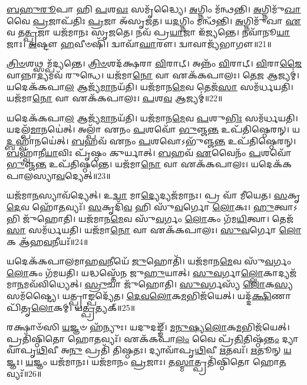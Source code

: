 \-\ul{𑌬}\-\-\ul{𑌹𑍁}\-\-\ul{𑌰𑍂}\-𑌪𑌾 𑌹𑌿 \ul{𑌪}\-𑌶\-\ul{𑌵𑌃} 𑌸𑌮𑍃᳴𑌦𑍍𑌧𑍍𑌯𑍈।
\-\ul{𑌅}\-𑌗𑍍𑌨𑌿𑌂 𑌮᳴𑌨𑍍𑌥𑌨𑍍𑌤𑌿।
\-\ul{𑌅}\-𑌗𑍍𑌨𑌿𑌮𑍁᳴\-\ul{𑌖𑌾} 𑌵𑍈 \ul{𑌪𑍍𑌰}\-𑌜𑌾\-𑌪᳴𑌤𑌿𑌃 \ul{𑌪𑍍𑌰}\-𑌜𑌾 𑌅᳴\-𑌸𑍃𑌜𑌤।
𑌯\-\ul{𑌦}\-𑌗𑍍𑌨𑌿𑌂 𑌮𑌨𑍍𑌥᳴𑌨𑍍𑌤𑌿।
\-\ul{𑌅}\-𑌗𑍍𑌨𑌿𑌮𑍁᳴𑌖𑌾 \ul{𑌏}\-𑌵 𑌤\-\ul{𑌤𑍍𑌪𑍍𑌰}\-𑌜𑌾 𑌯𑌜᳴𑌮𑌾𑌨𑌃 𑌸𑍃𑌜𑌤𑍇।
𑌨𑌵᳴ 𑌪𑍍𑌰\-\ul{𑌯𑌾}\-𑌜𑌾 𑌇᳴𑌜𑍍𑌯𑌨𑍍𑌤𑍇।
𑌨𑌵𑌾᳴𑌨𑍂\-\ul{𑌯𑌾}\-𑌜𑌾𑌃।
\-\ul{𑌅}\-𑌷𑍍𑌟𑍗 \ul{𑌹}\-𑌵𑍀𑍞𑌷𑌿᳴।
𑌦𑍍𑌵𑌾𑌵𑌾᳴\-\ul{𑌘𑌾}\-𑌰𑍗।
𑌦𑍍𑌵𑌾𑌵𑌾𑌜𑍍𑌯᳴𑌭𑌾𑌗𑍗॥21॥

\-\ul{𑌤𑍍𑌰𑌿}\-\-\ul{𑍞}\-𑌶𑌥𑍍𑌸𑌮𑍍𑌪᳴𑌦𑍍𑌯𑌨𑍍𑌤𑍇।
\-\ul{𑌤𑍍𑌰𑌿}\-\-\ul{𑍞}\-𑌶𑌦᳴𑌕𑍍𑌷𑌰𑌾 \ul{𑌵𑌿}\-𑌰𑌾𑌟𑍍।
𑌅𑌨𑍍𑌨𑌂᳴ \ul{𑌵𑌿}\-𑌰𑌾𑌟𑍍।
\-\ul{𑌵𑌿}\-𑌰𑌾\-\ul{𑌜𑍈}\-𑌵𑌾𑌨𑍍𑌨𑌾\-\ul{𑌦𑍍𑌯}\-𑌮𑌵᳴ 𑌰𑍁𑌨𑍍𑌧𑍇।
𑌯𑌜᳴𑌮𑌾\-\ul{𑌨𑍋} 𑌵𑌾 𑌏𑌕᳴𑌕𑌪𑌾𑌲𑌃।
𑌤𑍇\-\ul{𑌜} 𑌆𑌜𑍍𑌯𑌮𑍍॑।
𑌯𑌦𑍇𑌕᳴𑌕𑌪𑌾\-\ul{𑌲} 𑌆𑌜𑍍𑌯᳴\-\ul{𑌮𑌾}\-𑌨𑌯᳴𑌤𑌿।
𑌯𑌜᳴𑌮𑌾𑌨\-\ul{𑌮𑍇}\-𑌵 𑌤𑍇𑌜᳴\-\ul{𑌸𑌾} 𑌸𑌮᳴𑌰𑍍𑌧𑌯𑌤𑌿।
𑌯𑌜᳴𑌮𑌾\-\ul{𑌨𑍋} 𑌵𑌾 𑌏𑌕᳴𑌕𑌪𑌾𑌲𑌃।
\-\ul{𑌪}\-𑌶\-\ul{𑌵} 𑌆𑌜𑍍𑌯𑌮𑍍॑॥22॥

𑌯𑌦𑍇𑌕᳴𑌕𑌪𑌾\-\ul{𑌲} 𑌆𑌜𑍍𑌯᳴\-\ul{𑌮𑌾}\-𑌨𑌯᳴𑌤𑌿।
𑌯𑌜᳴𑌮𑌾𑌨\-\ul{𑌮𑍇}\-𑌵 \ul{𑌪}\-𑌶𑍁\-\ul{𑌭𑌿𑌃} 𑌸𑌮᳴𑌰𑍍𑌧𑌯𑌤𑌿।
𑌯𑌦𑌲𑍍𑌪᳴\-\ul{𑌮𑌾}\-𑌨𑌯𑍇॑𑌤𑍍।
𑌅𑌲𑍍𑌪𑌾᳴ 𑌏𑌨𑌂 \ul{𑌪}\-𑌶𑌵𑍋᳴ \ul{𑌭𑍁}\-𑌞𑍍𑌜\-\ul{𑌨𑍍𑌤} 𑌉𑌪᳴𑌤𑌿𑌷𑍍𑌠𑍇𑌰𑌨𑍍।
𑌯\-\ul{𑌦𑍍𑌬}\-𑌹𑍍𑌵𑌾᳴𑌨𑌯𑍇॑𑌤𑍍।
\-\ul{𑌬}\-𑌹𑌵᳴ 𑌏𑌨𑌂 \ul{𑌪}\-𑌶𑌵𑍋\-𑌽𑌭𑍁᳴𑌞𑍍𑌜\-\ul{𑌨𑍍𑌤} 𑌉𑌪᳴𑌤𑌿𑌷𑍍𑌠𑍇𑌰𑌨𑍍।
\-\ul{𑌬}\-𑌹𑍍𑌵𑌾᳴𑌨𑍀\-\ul{𑌯𑌾}\-𑌵𑌿𑌃 𑌪𑍃᳴𑌷𑍍𑌠𑌂 𑌕𑍁𑌰𑍍𑌯𑌾𑌤𑍍।
\-\ul{𑌬}\-𑌹𑌵᳴ \ul{𑌏}\-𑌵𑍈𑌨𑌂᳴ \ul{𑌪}\-𑌶𑌵𑍋᳴ \ul{𑌭𑍁}\-𑌞𑍍𑌜\-\ul{𑌨𑍍𑌤} 𑌉𑌪᳴𑌤𑌿𑌷𑍍𑌠𑌨𑍍𑌤𑍇।
𑌯𑌜᳴𑌮𑌾\-\ul{𑌨𑍋} 𑌵𑌾 𑌏𑌕᳴𑌕𑌪𑌾𑌲𑌃।
𑌯𑌦𑍇𑌕᳴𑌕𑌪𑌾𑌲𑌸𑍍𑌯𑌾\-\ul{𑌵}\-𑌦𑍍𑌯𑍇𑌤𑍍॥23॥

𑌯𑌜᳴𑌮𑌾\-\ul{𑌨}\-𑌸𑍍𑌯𑌾𑌵᳴𑌦𑍍𑌯𑍇𑌤𑍍।
𑌉\-\ul{𑌦𑍍𑌵𑌾} 𑌮𑌾\-\ul{𑌦𑍍𑌯𑍇}\-𑌦𑍍𑌯𑌜᳴𑌮𑌾𑌨𑌃।
𑌪𑍍𑌰 𑌵𑌾᳴ 𑌮𑍀𑌯𑍇𑌤।
\-\ul{𑌸}\-𑌕𑍃\-\ul{𑌦𑍇}\-𑌵 𑌹𑍋᳴\-\ul{𑌤}\-𑌵𑍍𑌯𑌃᳴।
\-\ul{𑌸}\-𑌕𑍃𑌦𑌿᳴\-\ul{𑌵} 𑌹𑌿 𑌸𑍁᳴\-\ul{𑌵}\-𑌰𑍍𑌗𑍋 \ul{𑌲𑍋}\-𑌕𑌃।
\-\ul{𑌹𑍁}\-𑌤𑍍𑌵𑌾𑌽𑌭𑌿 𑌜𑍁᳴𑌹𑍋𑌤𑌿।
𑌯𑌜᳴𑌮𑌾𑌨\-\ul{𑌮𑍇}\-𑌵 𑌸𑍁᳴\-\ul{𑌵}\-𑌰𑍍𑌗𑌂 \ul{𑌲𑍋}\-𑌕𑌂 𑌗᳴𑌮\-\ul{𑌯𑌿}\-𑌤𑍍𑌵𑌾।
𑌤𑍇𑌜᳴\-\ul{𑌸𑌾} 𑌸𑌮᳴𑌰𑍍𑌧𑌯𑌤𑌿।
𑌯𑌜᳴𑌮𑌾\-\ul{𑌨𑍋} 𑌵𑌾 𑌏𑌕᳴𑌕𑌪𑌾𑌲𑌃।
\-\ul{𑌸𑍁}\-\-\ul{𑌵}\-𑌰𑍍𑌗𑍋 \ul{𑌲𑍋}\-𑌕 𑌆᳴𑌹\-\ul{𑌵}\-𑌨𑍀𑌯𑌃᳴॥24॥

𑌯𑌦𑍇𑌕᳴𑌕𑌪𑌾𑌲𑌮𑌾𑌹\-\ul{𑌵}\-𑌨𑍀𑌯𑍇᳴ \ul{𑌜𑍁}\-𑌹𑍋𑌤𑌿᳴।
𑌯𑌜᳴𑌮𑌾𑌨\-\ul{𑌮𑍇}\-𑌵 𑌸𑍁᳴\-\ul{𑌵}\-𑌰𑍍𑌗𑌂 \ul{𑌲𑍋}\-𑌕𑌂 𑌗᳴𑌮𑌯𑌤𑌿।
𑌯𑌦𑍍𑌧𑌸𑍍𑌤𑍇᳴𑌨 𑌜𑍁\-\ul{𑌹𑍁}\-𑌯𑌾𑌤𑍍।
\-\ul{𑌸𑍁}\-\-\ul{𑌵}\-𑌰𑍍𑌗𑌾\-\ul{𑌲𑍍𑌲𑍋}\-𑌕𑌾𑌦𑍍𑌯𑌜᳴𑌮𑌾\-\ul{𑌨}\-𑌮𑌵᳴\-𑌵𑌿𑌧𑍍𑌯𑍇𑌤𑍍।
\-\ul{𑌸𑍍𑌰𑍁}\-𑌚𑌾 𑌜𑍁᳴𑌹𑍋𑌤𑌿।
\-\ul{𑌸𑍁}\-\-\ul{𑌵}\-𑌰𑍍𑌗𑌸𑍍𑌯᳴ \ul{𑌲𑍋}\-𑌕\-\ul{𑌸𑍍𑌯} 𑌸𑌮᳴𑌷𑍍𑌟𑍍𑌯𑍈।
𑌯𑌤𑍍𑌪𑍍𑌰𑌾𑌙𑍍𑌪𑌦𑍍𑌯𑍇᳴𑌤।
\-\ul{𑌦𑍇}\-\-\ul{𑌵}\-\-\ul{𑌲𑍋}\-𑌕\-\ul{𑌮}\-𑌭𑌿𑌜᳴𑌯𑍇𑌤𑍍।
𑌯𑌦𑍍𑌦᳴\-\ul{𑌕𑍍𑌷𑌿}\-𑌣𑌾 𑌪𑌿᳴𑌤𑍃\-\ul{𑌲𑍋}\-𑌕𑌮𑍍।
𑌯\-\ul{𑌤𑍍𑌪𑍍𑌰}\-𑌤𑍍𑌯𑌕𑍍॥25॥

𑌰𑌕𑍍𑌷𑌾𑍞᳴𑌸𑌿 \ul{𑌯}\-𑌜𑍍𑌞𑍞 𑌹᳴𑌨𑍍𑌯𑍁𑌃।
𑌯𑌦𑍁𑌦𑌙𑍍𑌙𑍍᳴।
\-\ul{𑌮}\-\-\ul{𑌨𑍁}\-\-\ul{𑌷𑍍𑌯}\-\-\ul{𑌲𑍋}\-𑌕\-\ul{𑌮}\-𑌭𑌿𑌜᳴𑌯𑍇𑌤𑍍।
𑌪𑍍𑌰𑌤𑌿᳴\-𑌷𑍍𑌠𑌿𑌤𑍋 𑌹𑍋\-\ul{𑌤}\-𑌵𑍍𑌯𑌃᳴।
𑌏𑌕᳴𑌕𑌪𑌾\-\ul{𑌲𑌂} 𑌵𑍈 𑌪𑍍𑌰᳴\-\ul{𑌤𑌿}\-𑌤𑌿𑌷𑍍𑌠᳴\-\ul{𑌨𑍍𑌤𑌂} 𑌦𑍍𑌯𑌾𑌵𑌾᳴𑌪𑍃\-\ul{𑌥𑌿}\-𑌵𑍀 𑌅\-\ul{𑌨𑍁} 𑌪𑍍𑌰𑌤𑌿᳴ 𑌤𑌿𑌷𑍍𑌠𑌤𑌃।
𑌦𑍍𑌯𑌾𑌵𑌾᳴𑌪𑍃\-\ul{𑌥𑌿}\-𑌵𑍀 \ul{𑌋}\-𑌤𑌵𑌃᳴।
\-\ul{𑌋}\-𑌤𑍂𑌨𑍍 \ul{𑌯}\-𑌜𑍍𑌞𑌃।
\-\ul{𑌯}\-𑌜𑍍𑌞𑌂 𑌯𑌜᳴𑌮𑌾𑌨𑌃।
𑌯𑌜᳴𑌮𑌾𑌨𑌂 \ul{𑌪𑍍𑌰}\-𑌜𑌾𑌃।
𑌤\-\ul{𑌸𑍍𑌮𑌾}\-𑌤𑍍𑌪𑍍𑌰𑌤𑌿᳴\-𑌷𑍍𑌠𑌿𑌤𑍋 𑌹𑍋\-\ul{𑌤}\-𑌵𑍍𑌯𑌃᳴॥26॥


